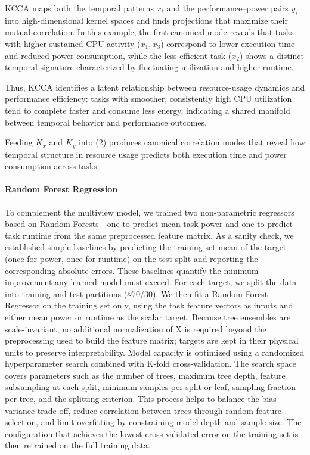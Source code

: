 KCCA maps both the temporal patterns \(x_i\)
and the performance–power pairs \(y_i\)
into high-dimensional kernel spaces
and finds projections that maximize their mutual correlation.
In this example, the first canonical mode reveals that
tasks with higher sustained CPU activity
(\(x_1, x_3\))
correspond to lower execution time and reduced power consumption,
while the less efficient task (\(x_2\))
shows a distinct temporal signature characterized by
fluctuating utilization and higher runtime.

Thus, KCCA identifies a latent relationship between
resource-usage dynamics and performance efficiency:
tasks with smoother, consistently high CPU utilization
tend to complete faster and consume less energy,
indicating a shared manifold between
temporal behavior and performance outcomes.

Feeding \(K_x\) and \(K_y\) into (2)
produces canonical correlation modes that reveal
how temporal structure in resource usage predicts both
execution time and power consumption across tasks.


\paragraph{Random Forest Regression}
\label{sec:random_forest_regression}
To complement the multiview model, we trained two non-parametric regressors based on Random Forests—one to predict mean task power and one to predict task runtime from the same preprocessed feature matrix. As a sanity check, we established simple baselines by predicting the training-set mean of the target (once for power, once for runtime) on the test split and reporting the corresponding absolute errors. These baselines quantify the minimum improvement any learned model must exceed.
For each target, we split the data into training and test partitions (≈70/30). We then fit a Random Forest Regressor on the training set only, using the task feature vectors as inputs and either mean power or runtime as the scalar target. Because tree ensembles are scale-invariant, no additional normalization of X is required beyond the preprocessing used to build the feature matrix; targets are kept in their physical units to preserve interpretability.
Model capacity is optimized using a randomized hyperparameter search combined with K-fold cross-validation. The search space covers parameters such as the number of trees, maximum tree depth, feature subsampling at each split, minimum samples per split or leaf, sampling fraction per tree, and the splitting criterion. This process helps to balance the bias–variance trade-off, reduce correlation between trees through random feature selection, and limit overfitting by constraining model depth and sample size. The configuration that achieves the lowest cross-validated error on the training set is then retrained on the full training data.

